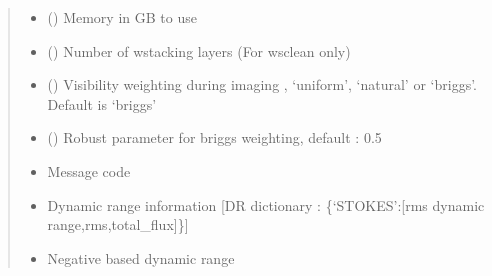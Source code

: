 \documentclass[letterpaper,10pt,english]{sphinxmanual}
\begin{document}
\begin{fulllineitems}
\begin{fulllineitems}
\begin{quote}
\begin{description}
\begin{itemize}
\item {} 
\sphinxAtStartPar
{} () \textendash{} Memory in GB to use

\item {} 
\sphinxAtStartPar
{} () \textendash{} Number of w\sphinxhyphen{}stacking layers (For wsclean only)

\item {} 
\sphinxAtStartPar
{} () \textendash{} Visibility weighting during imaging , ‘uniform’, ‘natural’ or ‘briggs’. Default is ‘briggs’

\item {} 
\sphinxAtStartPar
{} () \textendash{} Robust parameter for briggs weighting, default : 0.5

\end{itemize}

\item[{Returns}] \leavevmode
\sphinxAtStartPar
\begin{itemize}
\item {} 
\sphinxAtStartPar
{} \textendash{} Message code

\item {} 
\sphinxAtStartPar
{} \textendash{} Dynamic range information {[}DR dictionary : \{‘STOKES’:{[}rms dynamic range,rms,total\_flux{]}\}{]}

\item {} 
\sphinxAtStartPar
{} \textendash{} Negative based dynamic range

\end{itemize}


\end{description}\end{quote}

\end{fulllineitems}



\end{fulllineitems}
\end{document}
